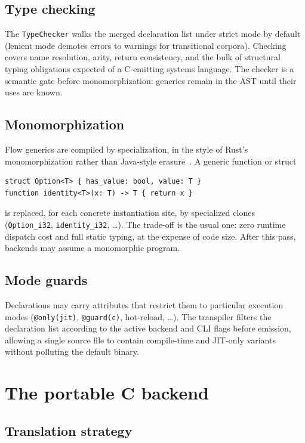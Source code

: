 \documentclass[11pt,a4paper]{article}
\theoremstyle{remark}
\begin{document}
\subsection{Type checking}
\label{sec:types}

The \texttt{TypeChecker} walks the merged declaration list under strict mode
by default (lenient mode demotes errors to warnings for transitional
corpora). Checking covers name resolution, arity, return consistency, and the
bulk of structural typing obligations expected of a C-emitting systems
language. The checker is a semantic gate before monomorphization: generics
remain in the AST until their uses are known.

\subsection{Monomorphization}
\label{sec:mono}

Flow generics are compiled by specialization, in the style of Rust's
monomorphization rather than Java-style erasure~\cite{flow-mono}. A generic
function or struct
\begin{lstlisting}
struct Option<T> { has_value: bool, value: T }
function identity<T>(x: T) -> T { return x }
\end{lstlisting}
is replaced, for each concrete instantiation site, by specialized clones
(\texttt{Option\_i32}, \texttt{identity\_i32}, \ldots). The trade-off is the
usual one: zero runtime dispatch cost and full static typing, at the expense
of code size. After this pass, backends may assume a monomorphic program.

\subsection{Mode guards}
\label{sec:guards}

Declarations may carry attributes that restrict them to particular execution
modes (\texttt{@only(jit)}, \texttt{@guard(c)}, hot-reload, \ldots). The
transpiler filters the declaration list according to the active backend and
CLI flags before emission, allowing a single source file to contain compile-time
and JIT-only variants without polluting the default binary.

\section{The portable C backend}
\label{sec:cbackend}

\subsection{Translation strategy}
\end{document}
